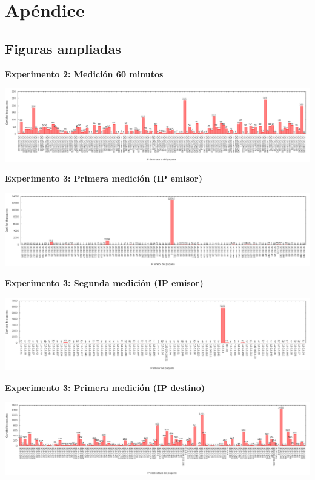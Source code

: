 \section{Apéndice}

\subsection{Figuras ampliadas}

\textbf{Experimento 2: Medición 60 minutos} \label{exp2_60_big}
\begin{center}
  \includegraphics[angle=90, height=0.8\textheight]{../mediciones/altop-wifi-60/altop60IpsDstArp.png}
\end{center}

\newpage

\textbf{Experimento 3: Primera medición (IP emisor)} \label{exp3_1_src}
\begin{center}
  \includegraphics[angle=90, height=0.8\textheight]{../mediciones/job1/src.png}
\end{center}

\newpage

\textbf{Experimento 3: Segunda medición (IP emisor)} \label{exp3_2_src}
\begin{center}
  \includegraphics[angle=90, height=0.8\textheight]{../mediciones/job2/src.png}
\end{center}

\newpage

\textbf{Experimento 3: Primera medición (IP destino)} \label{exp3_1_dst}
\begin{center}
  \includegraphics[angle=90, height=0.8\textheight]{../mediciones/job1/dst.png}
\end{center}


